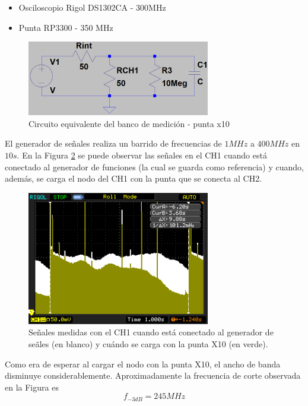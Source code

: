\documentclass[a4paper,10pt]{article}
\begin{document}
		\begin{itemize}
			\item Osciloscopio Rigol DS1302CA - 300MHz
			\item Punta RP3300 - 350 MHz
		\end{itemize}

		\begin{figure}[!htb]
			\centering
			\includegraphics[width=8cm]
			{Esquematicos/EsqFrecCortePuntaX10.png}
			\caption{Circuito equivalente del banco de medición - punta x10} 
			\label{esq001}
		\end{figure}

		\indent El generador de se\~nales realiza un barrido de frecuencias de
		$1MHz$ a $400MHz$ en $10s$. En la Figura \ref{img001} se puede 
		observar las se\~nales en el CH1 cuando est\'a conectado al 
		generador de funciones (la cual se guarda como referencia) y cuando, 
		adem\'as, se carga el nodo del CH1 con la punta que se conecta al CH2.
		
		\begin{figure}[!htb]
			\centering
			\includegraphics[width=8cm]
			{Imagenes/Mediciones instrumentos/NewFile1.png}
			\caption{Se\~nales medidas con el CH1 cuando est\'a conectado al 
			generador de se\~ales (en blanco) y cu\'ando se carga con la punta
			X10 (en verde).} \label{img001}
		\end{figure}
			
		\indent Como era de esperar al cargar el nodo con la punta X10, el 
		ancho de banda disminuye considerablemente. Aproximadamente la 
		frecuencia de corte observada en la Figura es $$f_{-3dB}=245MHz$$
\end{document}
